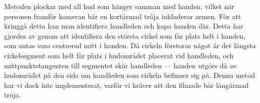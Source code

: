 Metoden plockar med all hud som hänger samman med
handen, vilket när personen framför kameran bär en kortärmad tröja inkluderar
armen. För att
kringgå detta kan man identifiera handleden och kapa handen
där. Detta har gjordes av  genom att identifiera den 
största cirkel
som får plats helt i handen, som antas vara centrerad mitt i handen. Då
cirkeln förstoras något är det längsta cirkelsegment som helt får
plats i hudområdet placerat vid handleden, och mittpunktstangenten
till segmentet skär handleden --- handen utgörs då av hudområdet på den
sida om handleden som cirkeln befinner sig på. Denna metod har vi dock
inte implementerat, varför vi kräver att den filmade bär
långärmad tröja. 

